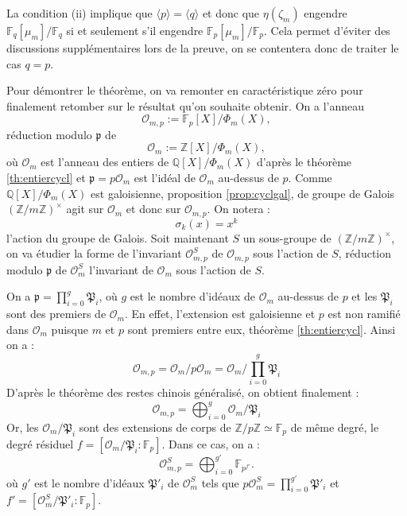 \documentclass[a4paper]{article} %
\numberwithin{section}{part}
\numberwithin{equation}{section}
\newcommand\zmodninv[1]{(\mathbb{Z}/#1\mathbb{Z})^{\times}}
\newcommand\GF[1]{\mathbb{F}_{#1}}
\newcommand\QQ{\mathbb{Q}}
\newcommand\ZZ{\mathbb{Z}}
\newcommand\EO{\mathcal{O}}
\newcommand\groupgen[1]{\langle{#1}\rangle}
\begin{document}
La condition (ii) implique que $\groupgen{p} = \groupgen{q}$ et donc que
$\eta(\zeta_m)$ engendre $\GF{q}[\mu_m]/\GF{q}$ si et seulement s'il engendre
$\GF{p}[\mu_m]/\GF{p}$. Cela permet d'éviter des discussions supplémentaires 
lors de la preuve, on se contentera donc de traiter le cas $q = p$.\par
Pour démontrer le théorème, on va remonter en caractéristique zéro pour
finalement retomber sur le résultat qu'on souhaite obtenir. On a l'anneau 
\begin{equation}
\EO_{m,p} := \GF{p}[X]/\Phi_m(X),
\end{equation}
réduction modulo $\mathfrak{p}$ de 
\begin{equation}
\EO_m := \ZZ[X]/\Phi_m(X),
\end{equation}
où $\EO_m$ est l'anneau des entiers de $\QQ[X]/\Phi_m(X)$ d'après le théorème 
\ref{th:entiercycl} et $\mathfrak{p} = p\EO_m$ est l'idéal de $\EO_m$ au-dessus 
de $p$. Comme $\QQ[X]/\Phi_m(X)$ est galoisienne, proposition 
\ref{prop:cyclgal}, de groupe de Galois $\zmodninv{m}$ agit sur $\EO_m$ et donc 
sur $\EO_{m,p}$. On notera :
\begin{equation}
\sigma_k(x) = x^k
\end{equation}
l'action du groupe de Galois. Soit maintenant $S$ un sous-groupe de 
$\zmodninv{m}$, on va étudier la forme de l'invariant $\EO_{m,p}^S$  de 
$\EO_{m,p}$ sous l'action de $S$, réduction modulo $\mathfrak{p}$ de $\EO_m^S$ 
l'invariant de $\EO_m$ sous l'action de $S$.\par
On a $\mathfrak{p} = \prod_{i=0}^g{\mathfrak{P}_i}$, où $g$ est le nombre
d'idéaux de $\EO_m$ au-dessus de $p$ et les $\mathfrak{P}_i$ sont des premiers
de $\EO_m$. En effet, l'extension est galoisienne et $p$ est non ramifié dans 
$\EO_m$ puisque $m$ et $p$ sont premiers entre eux, théorème 
\ref{th:entiercycl}. Ainsi on a :
\begin{equation}
\EO_{m,p} = \EO_m/p\EO_m = \EO_m/\prod_{i=0}^g{\mathfrak{P}_i}
\end{equation}
D'après le théorème des restes chinois généralisé, on obtient finalement :
\begin{equation}
\EO_{m,p} = \bigoplus_{i=0}^g{\EO_m/\mathfrak{P}_i}
\end{equation}
Or, les $\EO_m/\mathfrak{P}_i$ sont des extensions de corps de $\ZZ/p\ZZ\simeq
\GF{p}$ de même degré, le degré résiduel $f = [\EO_m/\mathfrak{P}_i:\GF{p}]$. 
Dans ce cas, on a :
\begin{equation}
\label{eq:structinvSmodp}
\EO_{m,p}^S = \bigoplus_{i=0}^{g'}{\GF{p^{f'}}}.
\end{equation}
où $g'$ est le nombre d'idéaux $\mathfrak{P}'_i$ de $\EO_m^S$ tels que $p\EO_m^S
= \prod_{i = 0}^{g'}{\mathfrak{P}'_i}$ et $f' = 
[\EO_m^S/\mathfrak{P}'_i:\GF{p}]$.
\end{document}
